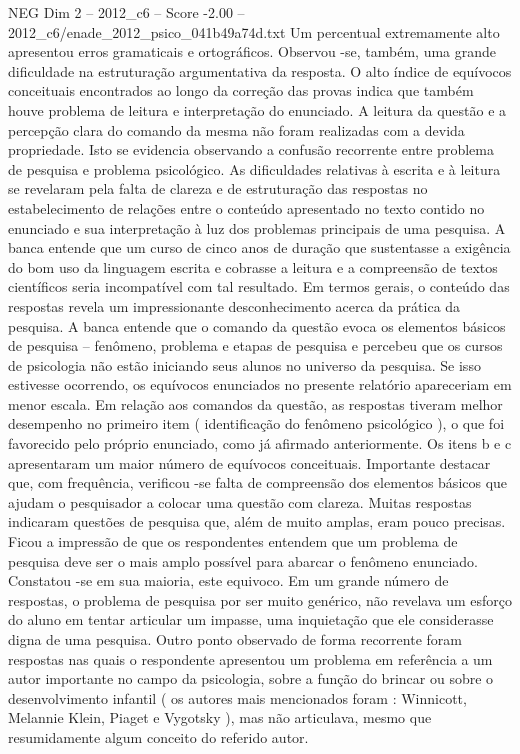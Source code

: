 \begin{textsample}{NEG Dim 2 – 2012\_c6 – Score -2.00 – 2012\_c6/enade\_2012\_psico\_041b49a74d.txt}
Um percentual extremamente alto apresentou erros gramaticais e ortográficos.
Observou -se, também, uma grande dificuldade na estruturação argumentativa da resposta.
O alto índice de equívocos conceituais encontrados ao longo da correção das provas indica que também houve problema de leitura e interpretação do enunciado.
A leitura da questão e a percepção clara do comando da mesma não foram realizadas com a devida propriedade.
Isto se evidencia observando a confusão recorrente entre problema de pesquisa e problema psicológico.
As dificuldades relativas à escrita e à leitura se revelaram pela falta de clareza e de estruturação das respostas no estabelecimento de relações entre o conteúdo apresentado no texto contido no enunciado e sua interpretação à luz dos problemas principais de uma pesquisa.
A banca entende que um curso de cinco anos de duração que sustentasse a exigência do bom uso da linguagem escrita e cobrasse a leitura e a compreensão de textos científicos seria incompatível com tal resultado.
Em termos gerais, o conteúdo das respostas revela um impressionante desconhecimento acerca da prática da pesquisa.
A banca entende que o comando da questão evoca os elementos básicos de pesquisa – fenômeno, problema e etapas de pesquisa e percebeu que os cursos de psicologia não estão iniciando seus alunos no universo da pesquisa.
Se isso estivesse ocorrendo, os equívocos enunciados no presente relatório apareceriam em menor escala.
Em relação aos comandos da questão, as respostas tiveram melhor desempenho no primeiro item ( identificação do fenômeno psicológico ), o que foi favorecido pelo próprio enunciado, como já afirmado anteriormente.
Os itens b e c apresentaram um maior número de equívocos conceituais.
Importante destacar que, com frequência, verificou -se falta de compreensão dos elementos básicos que ajudam o pesquisador a colocar uma questão com clareza.
Muitas respostas indicaram questões de pesquisa que, além de muito amplas, eram pouco precisas.
Ficou a impressão de que os respondentes entendem que um problema de pesquisa deve ser o mais amplo possível para abarcar o fenômeno enunciado.
Constatou -se em sua maioria, este equivoco.
Em um grande número de respostas, o problema de pesquisa por ser muito genérico, não revelava um esforço do aluno em tentar articular um impasse, uma inquietação que ele considerasse digna de uma pesquisa.
Outro ponto observado de forma recorrente foram respostas nas quais o respondente apresentou um problema em referência a um autor importante no campo da psicologia, sobre a função do brincar ou sobre o desenvolvimento infantil ( os autores mais mencionados foram : Winnicott, Melannie Klein, Piaget e Vygotsky ), mas não articulava, mesmo que resumidamente algum conceito do referido autor.

\end{textsample}
